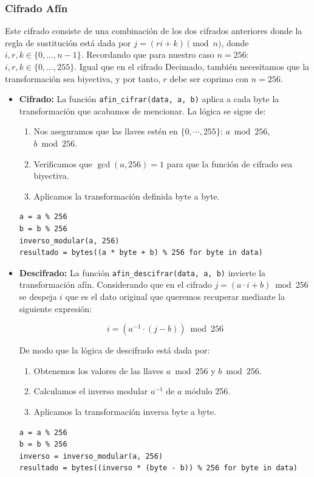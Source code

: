 \documentclass[12pt, a4paper]{article}
\begin{document}
\subsubsection*{Cifrado Afín}

Este cifrado consiste de una combinación de los dos cifrados anteriores donde la regla de sustitución está dada por
$j = (ri + k) \pmod n$, donde $i,r,k \in \{0, \dots, n-1\}$. Recordando que para nuestro caso $n=256$: $i,r,k \in \{0, \dots, 255\}$. 
Igual que en el cifrado Decimado, también necesitamos que la transformación sea biyectiva, y por tanto, $r$ debe ser coprimo con $n=256$.

\begin{itemize}
    \item \textbf{Cifrado:} La función \texttt{afin\_cifrar(data, a, b)} aplica a cada byte la transformación que
    acabamos de mencionar. La lógica se sigue de:

\begin{enumerate}
    \item Nos aseguramos que las llaves estén en $\{0,  \cdots, 255\}$: $a \bmod 256$, $b \bmod 256$.
    \item Verificamos que $\gcd(a, 256) = 1$ para que la función de cifrado sea biyectiva.
    \item Aplicamos la transformación definida byte a byte.
\end{enumerate}

\begin{verbatim}
a = a % 256
b = b % 256
inverso_modular(a, 256)
resultado = bytes((a * byte + b) % 256 for byte in data)
\end{verbatim}
    
    \item \textbf{Descifrado:} La función \texttt{afin\_descifrar(data, a, b)} invierte la transformación afín.
Considerando que en el cifrado $j = (a \cdot i + b) \bmod 256$ se despeja $i$ que es el dato original que queremos
recuperar mediante la siguiente expresión:

\[
    i = (a^{-1} \cdot (j - b)) \bmod 256
\]

De modo que la lógica de descifrado está dada por:
\begin{enumerate}
    \item Obtenemos los valores de las llaves $a \bmod 256$ y $b \bmod 256$.
    \item Calculamos el inverso modular $a^{-1}$ de $a$ módulo 256.
    \item Aplicamos la transformación inversa byte a byte.
\end{enumerate}

\begin{verbatim}
a = a % 256
b = b % 256
inverso = inverso_modular(a, 256)
resultado = bytes((inverso * (byte - b)) % 256 for byte in data)
\end{verbatim}
\end{itemize}
\end{document}

